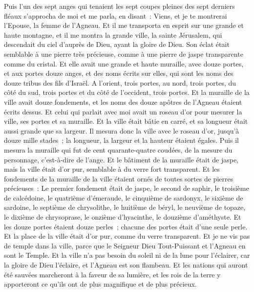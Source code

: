 \begin{multicols}{2}
Puis l'un des sept anges qui tenaient les sept coupes pleines des sept derniers fléaux s'approcha de moi et me parla, en disant~: Viens, et je te montrerai l'Epouse, la femme de l'Agneau.
Et il me transporta en esprit sur une grande et haute montagne, et il me montra la grande ville, la sainte Jérusalem, qui descendait du ciel d'auprès de Dieu,
ayant la gloire de Dieu. Son éclat était semblable à une pierre très précieuse, comme à une pierre de jaspe transparente comme du cristal.
Et elle avait une grande et haute muraille, avec douze portes, et aux portes douze anges, et des noms écrits sur elles, qui sont les noms des douze tribus des fils d'Israël.
A l'orient, trois portes, au nord, trois portes, du côté du sud, trois portes et du côté de l'occident, trois portes.
Et la muraille de la ville avait douze fondements, et les noms des douze apôtres de l'Agneau étaient écrits dessus.
Et celui qui parlait avec moi avait un roseau d'or pour mesurer la ville, ses portes et sa muraille.
Et la ville était bâtie en carré, et sa longueur était aussi grande que sa largeur. Il mesura donc la ville avec le roseau d'or, jusqu'à douze mille stades~; la longueur, la largeur et la hauteur étaient égales.
Puis il mesura la muraille qui fut de cent quarante-quatre coudées, de la mesure du personnage, c'est-à-dire de l'ange.
Et le bâtiment de la muraille était de jaspe, mais la ville était d'or pur, semblable à du verre fort transparent.
Et les fondements de la muraille de la ville étaient ornés de toutes sortes de pierres précieuses~: Le premier fondement était de jaspe, le second de saphir, le troisième de calcédoine, le quatrième d'émeraude,
le cinquième de sardonyx, le sixième de sardoine, le septième de chrysolithe, le huitième de béryl, le neuvième de topaze, le dixième de chrysoprase, le onzième d'hyacinthe, le douzième d'améthyste.
Et les douze portes étaient douze perles~; chacune des portes était d'une seule perle. Et la place de la ville était d'or pur, comme du verre transparent.
Et je ne vis pas de temple dans la ville, parce que le Seigneur Dieu Tout-Puissant et l'Agneau en sont le Temple.
Et la ville n'a pas besoin du soleil ni de la lune pour l'éclairer, car la gloire de Dieu l'éclaire, et l'Agneau est son flambeau.
Et les nations qui auront été sauvées marcheront à la faveur de sa lumière, et les rois de la terre y apporteront ce qu'ils ont de plus magnifique et de plus précieux.

\end{multicols}
